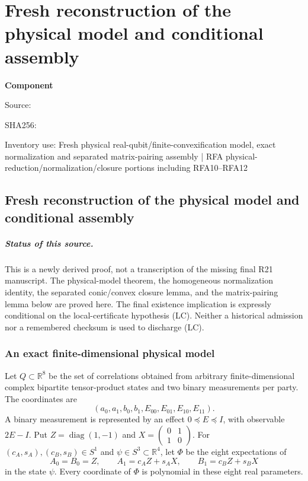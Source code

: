 \chapter{Fresh reconstruction of the physical model and conditional assembly}
\label{component:p9b00698ff36a}
\noindent\textbf{Component }\par
{\small\noindent Source: \par}
{\small\noindent SHA256: \par}
{\small\noindent Inventory use: Fresh physical real-qubit/finite-convexification model, exact normalization and separated matrix-pairing assembly | RFA physical-reduction/normalization/closure portions including RFA10--RFA12\par}
\medskip
\section{Fresh reconstruction of the physical model and conditional assembly}
\label{p9b00698ff36a:sec:fresh-r21-conditional-assembly}

\paragraph{Status of this source.}
This is a newly derived proof, not a transcription of the missing final
R21 manuscript. The physical-model theorem, the homogeneous normalization
identity, the separated conic/convex closure lemma, and the matrix-pairing
lemma below are proved here. The final existence implication is expressly
conditional on the local-certificate hypothesis (LC). Neither a historical
admission nor a remembered checksum is used to discharge (LC).

\subsection{An exact finite-dimensional physical model}

Let $Q\subset\mathbb R^8$ be the set of correlations obtained from arbitrary
finite-dimensional complex bipartite tensor-product states and two binary
measurements per party. The coordinates are
\[
 (a_0,a_1,b_0,b_1,E_{00},E_{01},E_{10},E_{11}).
 \tag{RFA1}
\]
A binary measurement is represented by an effect $0\preceq E\preceq I$,
with observable $2E-I$. Put
$Z=\operatorname{diag}(1,-1)$ and
$X=\left(\begin{smallmatrix}0&1\\1&0\end{smallmatrix}\right)$.
For $(c_A,s_A),(c_B,s_B)\in S^1$ and $\psi\in S^3\subset\mathbb R^4$,
let $\Phi$ be the eight expectations of
\[
 A_0=B_0=Z,\qquad A_1=c_AZ+s_AX,\qquad B_1=c_BZ+s_BX
 \tag{RFA2}
\]
in the state $\psi$. Every coordinate of $\Phi$ is polynomial in these
eight real parameters.

